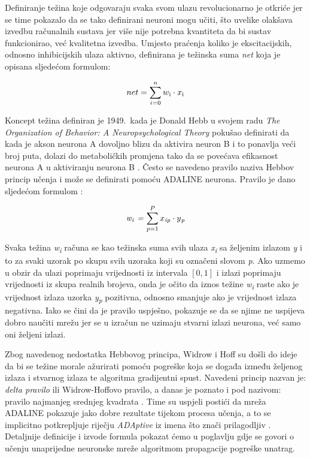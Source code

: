 \documentclass[times, utf8, zavrsni]{fer}
\begin{document}
Definiranje težina koje odgovaraju svaka svom ulazu revolucionarno je otkriće jer se time pokazalo da se tako definirani neuroni mogu učiti, što uvelike olakšava izvedbu računalnih sustava jer više nije potrebna kvantiteta da bi sustav funkcionirao, već kvalitetna izvedba. Umjesto praćenja koliko je ekscitacijskih, odnosno inhibicijskih ulaza aktivno, definirana je težinska suma \textit{net} koja je opisana sljedećom formulom:

\begin{equation}
    \label{net:eq}
    \text{$net = \sum\limits_{i=0}^n w\textsubscript{i} \cdot x\textsubscript{i}$}
\end{equation}

\bigskip

Koncept težina definiran je 1949.\ kada je Donald Hebb u svojem radu \textit{The Organization of Behavior: A Neuropsychological Theory} pokušao definirati da kada je akson neurona A dovoljno blizu da aktivira neuron B i to ponavlja veći broj puta, dolazi do metaboličkih promjena tako da se povećava efikasnost neurona A u aktiviranju neurona B \citep{hebb}. Često se navedeno pravilo naziva Hebbov princip učenja i može se definirati pomoću ADALINE neurona. Pravilo je dano sljedećom formulom \citep{picton2000}:

\begin{equation}
    \textit{w\textsubscript{i} = $\sum\limits_{p = 1}^P x\textsubscript{ip} \cdot y\textsubscript{p}$}
\end{equation}

\bigskip

Svaka težina \textit{w\textsubscript{i}} računa se kao težinska suma svih ulaza \textit{x\textsubscript{i}} sa željenim izlazom \textit{y} i to za svaki uzorak po skupu svih uzoraka koji su označeni slovom \textit{p}. Ako uzmemo u obzir da ulazi poprimaju vrijednosti iz intervala $[0,1]$ i izlazi poprimaju vrijednosti iz skupa realnih brojeva, onda je očito da iznos težine \textit{w\textsubscript{i}} raste ako je vrijednost izlaza uzorka \textit{y\textsubscript{p}} pozitivna, odnosno smanjuje ako je vrijednost izlaza negativna. Iako se čini da je pravilo uspješno, pokazuje se da se njime ne uspijeva dobro naučiti mrežu jer se u izračun ne uzimaju stvarni izlazi neurona, već samo oni željeni izlazi.

Zbog navedenog nedostatka Hebbovog principa, Widrow i Hoff su došli do ideje da bi se težine morale ažurirati pomoću pogreške  koja se događa između željenog izlaza i stvarnog izlaza te algoritma gradijentni spust. Navedeni princip nazvan je: \textit{delta pravilo}  ili Widrow-Hoffovo pravilo, a danas je poznato i pod nazivom: pravilo najmanjeg srednjeg kvadrata . Time su uspjeli postići da mreža ADALINE pokazuje jako dobre rezultate tijekom procesa učenja, a to se implicitno potkrepljuje riječju \textit{ADAptive} iz imena što znači prilagodljiv \citep{picton2000}. Detaljnije definicije i izvode formula pokazat ćemo u poglavlju gdje se govori o učenju unaprijedne neuronske mreže algoritmom propagacije pogreške unatrag.
\end{document}
